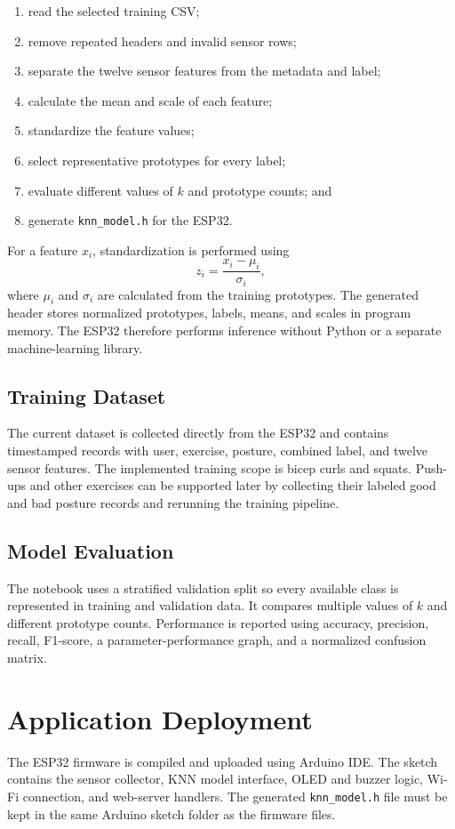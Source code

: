 \begin{enumerate}
	\item read the selected training CSV;
	\item remove repeated headers and invalid sensor rows;
	\item separate the twelve sensor features from the metadata and label;
	\item calculate the mean and scale of each feature;
	\item standardize the feature values;
	\item select representative prototypes for every label;
	\item evaluate different values of $k$ and prototype counts; and
	\item generate \texttt{knn\_model.h} for the ESP32.
\end{enumerate}

For a feature $x_i$, standardization is performed using
\begin{equation}
z_i = \frac{x_i-\mu_i}{\sigma_i},
\end{equation}
where $\mu_i$ and $\sigma_i$ are calculated from the training prototypes. The
generated header stores normalized prototypes, labels, means, and scales in program
memory. The ESP32 therefore performs inference without Python or a separate
machine-learning library.

\subsection{Training Dataset}
The current dataset is collected directly from the ESP32 and contains timestamped
records with user, exercise, posture, combined label, and twelve sensor features.
The implemented training scope is bicep curls and squats. Push-ups and other
exercises can be supported later by collecting their labeled good and bad posture
records and rerunning the training pipeline.

\subsection{Model Evaluation}
The notebook uses a stratified validation split so every available class is
represented in training and validation data. It compares multiple values of $k$
and different prototype counts. Performance is reported using accuracy, precision,
recall, F1-score, a parameter-performance graph, and a normalized confusion matrix.

\section{Application Deployment}
The ESP32 firmware is compiled and uploaded using Arduino IDE. The sketch contains
the sensor collector, KNN model interface, OLED and buzzer logic, Wi-Fi connection,
and web-server handlers. The generated \texttt{knn\_model.h} file must be kept in
the same Arduino sketch folder as the firmware files.

